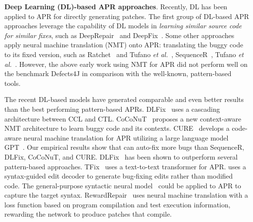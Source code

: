 {\bf Deep Learning (DL)-based APR approaches}. Recently, DL has been
applied to APR for directly generating patches.  The first group of
DL-based APR approaches leverage the capability of DL models in {\em
  learning similar source code for similar fixes}, such as
DeepRepair~\cite{white2016deep} and DeepFix~\cite{gupta2017deepfix}.
Some other approaches apply neural machine translation (NMT) onto APR:
translating the buggy code to its fixed version, such as
Ratchet~\cite{hata2018learning} and Tufano {\em et
  al.}~\cite{tufano2018empirical}, SequenceR~\cite{chen2018sequencer},
Tufano {\em et al.}~\cite{tufano2019learning}. However, the above
early work using NMT for APR did not perform well on the benchmark
Defects4J in comparison with the well-known, pattern-based tools.

The recent DL-based models have generated comparable and even better
results than the best performing pattern-based
APRs. DLFix~\cite{icse20} uses a cascading architecture
between CCL and CTL.
CoCoNuT~\cite{lutellier2020coconut} proposes a new context-aware NMT
architecture to learn buggy code and its
contexts. CURE~\cite{cure-icse21} develops a code-aware neural machine
translation for APR utilizing a large language model
GPT~\cite{radford2018improving}. Our empirical results show that
{\tool} can auto-fix more bugs than SequenceR, DLFix, CoCoNuT, and
CURE. DLFix~\cite{icse20} has been shown to outperform several
pattern-based approaches. TFix~\cite{tfix-21} uses a text-to-text
transformer for APR. \cite{recoder-fse21} uses a syntax-guided edit
decoder to generate bug-fixing edits rather than modified code.  The
general-purpose syntactic neural
model~\cite{yin-neubig-2017-syntactic} could be applied to APR to
capture the target syntax. RewardRepair~\cite{monperrus-icse22} uses
neural machine translation with a loss function based on program
compilation and test execution information, rewarding the network to
produce patches that compile.
  
